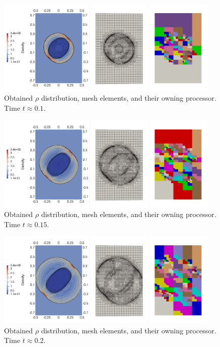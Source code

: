 \begin{figure}[H]
	\begin{center}
		\includegraphics[width=0.95\textwidth]{img/mhd-blast/new/adapt-full1.jpg}
\vspace{-3mm}
	\caption{Obtained $\rho$ distribution, mesh elements, and their owning processor. Time $t\approx 0.1$.}
	\label{figure:amrBlast2}
	\end{center}
\end{figure}
\vspace{-10mm}

\begin{figure}[H]
	\begin{center}
		\includegraphics[width=0.95\textwidth]{img/mhd-blast/new/adapt-full2.jpg}
\vspace{-3mm}
	\caption{Obtained $\rho$ distribution, mesh elements, and their owning processor. Time $t\approx 0.15$.}
	\label{figure:amrBlast3}
	\end{center}
\end{figure}
\vspace{-10mm}

\begin{figure}[H]
	\begin{center}
		\includegraphics[width=0.95\textwidth]{img/mhd-blast/new/adapt-full3.jpg}
\vspace{-3mm}
	\caption{Obtained $\rho$ distribution, mesh elements, and their owning processor. Time $t\approx 0.2$.}
	\label{figure:amrBlast4}
	\end{center}
\end{figure}
\vspace{-10mm}

